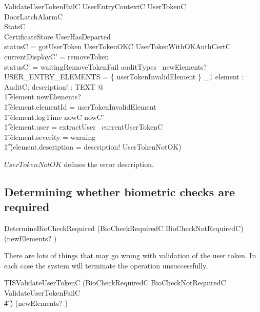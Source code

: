 \begin{schema}{ValidateUserTokenFailC}
        UserEntryContextC
\also
        \Xi UserTokenC
\\      \Xi DoorLatchAlarmC        
\\      \Xi StatsC
\\      \Xi CertificateStore
\where
        \lnot UserHasDeparted
\\      statusC = gotUserToken
\also
        \lnot UserTokenOKC \land \lnot UserTokenWithOKAuthCertC
\also
	currentDisplayC' = removeToken
\\      statusC' = waitingRemoveTokenFail
\also
        auditTypes~ newElements? \cap USER\_ENTRY\_ELEMENTS = 
        \{ userTokenInvalidElement \} 
\also
        \exists_1 element : AuditC; description! : TEXT @ 
\\ \t1  element \in newElements? 
\\ \t1  \land element.elementId = userTokenInvalidElement
\\ \t1  \land element.logTime \in nowC \upto nowC'
\\ \t1  \land element.user = extractUser~ currentUserTokenC
\\ \t1  \land element.severity = warning
\\ \t1  \land (element.description = description! \land UserTokenNotOK)

\end{schema}
\begin{Zcomment}
\item
$UserTokenNotOK$ defines the error description.
\end{Zcomment}

\subsection{Determining whether biometric checks are required}


\begin{zed}
        DetermineBioCheckRequired  (BioCheckRequiredC \lor
        BioCheckNotRequiredC) \hide (newElements? )
\end{zed}

There are lots of things that may go wrong with validation of the user
token. In each case the system will terminate the operation unsuccessfully.

\begin{zed}
        TISValidateUserTokenC  
                (BioCheckRequiredC 
                \lor BioCheckNotRequiredC
                \lor ValidateUserTokenFailC 
\\ \t4 \lor
        [~UserTokenTornC | statusC = gotUserToken ] ) \hide (newElements? )
\end{zed}


